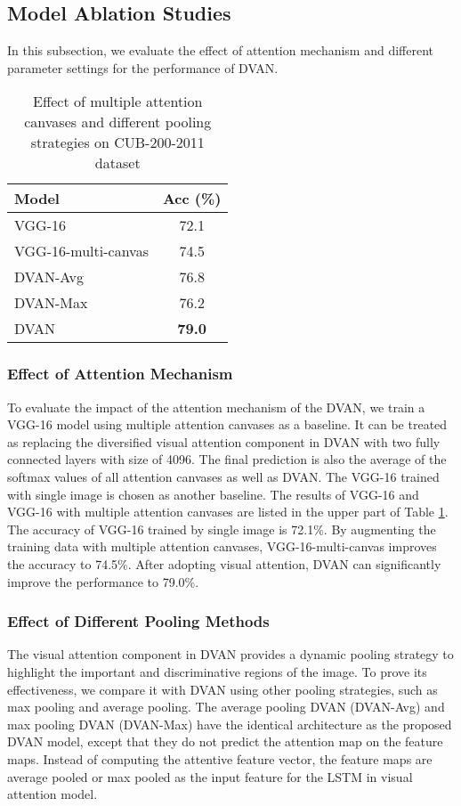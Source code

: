 \documentclass[journal]{IEEEtran}
\begin{document}
\subsection{Model Ablation Studies}
In this subsection, we evaluate the effect of attention mechanism and different parameter settings for the performance of DVAN.

\begin{table}[!bt]
  \centering
  \vspace{-0.1in}
  \caption{Effect of multiple attention canvases and different pooling strategies on CUB-200-2011 dataset}
  \label{tab:comparison_pool_cub}
  \begin{tabular}{lc}
    \hline\hline
    Model                & Acc (\%)\\
    \hline
    VGG-16               & 72.1  \\
    VGG-16-multi-canvas & 74.5  \\
    \hline
    DVAN-Avg  & 76.8  \\
    DVAN-Max      & 76.2  \\
    DVAN       & \textbf{79.0}\\
    \hline\hline
  \end{tabular}
  \vspace{-0.2in}
\end{table}

\subsubsection{Effect of Attention Mechanism}
To evaluate the impact of the attention mechanism of the DVAN, we train a VGG-16 model using multiple attention canvases as a baseline. It can be treated as replacing the diversified visual attention component in DVAN with two fully connected layers with size of 4096. The final prediction is also the average of the softmax values of all attention canvases as well as DVAN. The VGG-16 trained with single image is chosen as another baseline. The results of VGG-16 and VGG-16 with multiple attention canvases are listed in the upper part of Table \ref{tab:comparison_pool_cub}. The accuracy of VGG-16 trained by single image is 72.1\%. By augmenting the training data with multiple attention canvases, VGG-16-multi-canvas improves the accuracy to 74.5\%. After adopting visual attention, DVAN can significantly improve the performance to 79.0\%.

\subsubsection{Effect of Different Pooling Methods}
The visual attention component in DVAN provides a dynamic pooling strategy to highlight the important and discriminative regions of the image. To prove its effectiveness, we compare it with DVAN using other pooling strategies, such as max pooling and average pooling.
The average pooling DVAN (DVAN-Avg) and max pooling DVAN (DVAN-Max) have the identical architecture as the proposed DVAN model, except that they do not predict the attention map on the feature maps. Instead of computing the attentive feature vector, the feature maps are average pooled or max pooled as the input feature for the LSTM in visual attention model.
\end{document}
